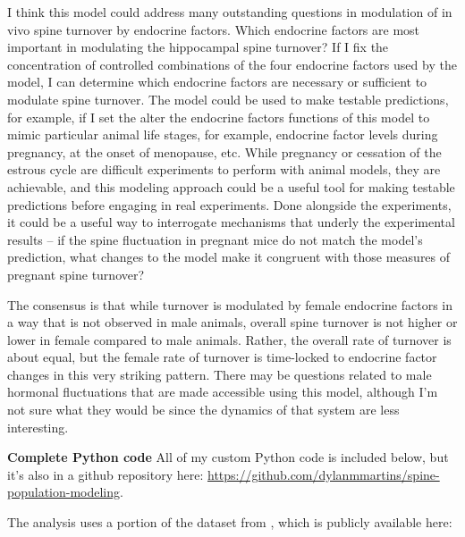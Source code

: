 \documentclass[11pt]{article}
\begin{document}
I think this model could address many outstanding questions in modulation of in vivo spine turnover by endocrine factors. Which endocrine factors are most important in modulating the hippocampal spine turnover? If I fix the concentration of controlled combinations of the four endocrine factors used by the model, I can determine which endocrine factors are necessary or sufficient to modulate spine turnover. The model could be used to make testable predictions, for example, if I set the alter the endocrine factors functions of this model to mimic particular animal life stages, for example, endocrine factor levels during pregnancy, at the onset of menopause, etc. While pregnancy or cessation of the estrous cycle are difficult experiments to perform with animal models, they are achievable, and this modeling approach could be a useful tool for making testable predictions before engaging in real experiments. Done alongside the experiments, it could be a useful way to interrogate mechanisms that underly the experimental results -- if the spine fluctuation in pregnant mice do not match the model's prediction, what changes to the model make it congruent with those measures of pregnant spine turnover?

The consensus is that while turnover is modulated by female endocrine factors in a way that is not observed in male animals, overall spine turnover is not higher or lower in female compared to male animals. Rather, the overall rate of turnover is about equal, but the female rate of turnover is time-locked to endocrine factor changes in this very striking pattern. There may be questions related to male hormonal fluctuations that are made accessible using this model, although I'm not sure what they would be since the dynamics of that system are less interesting.


\vspace{10pt}
\noindent \textbf{Complete Python code}
All of my custom Python code is included below, but it's also in a github repository here: \href{https://github.com/dylanmmartins/spine-population-modeling}{https://github.com/dylanmmartins/spine-population-modeling}.

The analysis uses a portion of the dataset from \cite{nora}, which is publicly available here:
\end{document}
